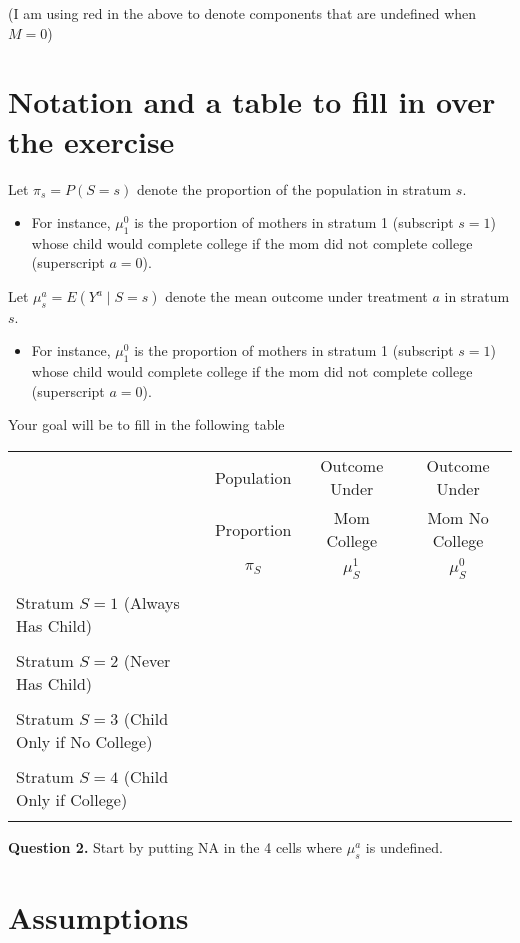 \documentclass[10pt]{article}
\begin{document}
(I am using red in the above to denote components that are undefined when $M = 0$)

\clearpage
\section*{Notation and a table to fill in over the exercise}

Let $\pi_s = P(S = s)$ denote the proportion of the population in stratum $s$.
\begin{itemize}
    \item For instance, $\mu^0_1$ is the proportion of mothers in stratum 1 (subscript $s = 1$) whose child would complete college if the mom did not complete college (superscript $a = 0$).
\end{itemize}

Let $\mu^a_s = E(Y^a\mid S = s)$ denote the mean outcome under treatment $a$ in stratum $s$.
\begin{itemize}
    \item For instance, $\mu^0_1$ is the proportion of mothers in stratum 1 (subscript $s = 1$) whose child would complete college if the mom did not complete college (superscript $a = 0$).
\end{itemize}

Your goal will be to fill in the following table

\begin{tabular}{lccc}
\hline
 & Population & Outcome Under & Outcome Under \\
 & Proportion & Mom College & Mom No College \\
 & $\pi_S$ & $\mu^1_S$ & $\mu^0_S$ \\
 \hline
 \\
 Stratum $S = 1$ (Always Has Child)  \\
 \\
 Stratum $S = 2$ (Never Has Child) \\
 \\
 Stratum $S = 3$ (Child Only if No College) \\
 \\
 Stratum $S = 4$ (Child Only if College) \\
 \\
 \hline
\end{tabular}

\textbf{Question 2.} Start by putting NA in the 4 cells where $\mu^a_s$ is undefined.

\section*{Assumptions}
\end{document}
